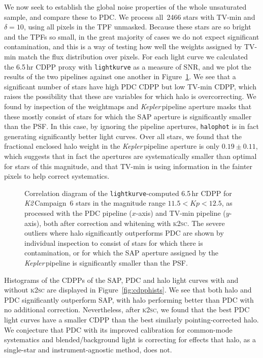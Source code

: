 \documentclass[modern]{aastex62}
\newcommand\kepler{\emph{Kepler}\,}
\newcommand\ktwo{\emph{K2}\,}
\begin{document}
We now seek to establish the global noise properties of the whole unsaturated sample, and compare these to PDC. We process all~2466 stars with TV-min and $\delta = 10$, using all pixels in the TPF unmasked. Because these stars are so bright and the TPFs so small, in the great majority  of cases we do not expect significant contamination, and this is a way of testing how well the weights assigned by TV-min match the flux distribution over pixels. For each light curve we calculated the 6.5\,hr CDPP proxy with \texttt{lightkurve} as a measure of SNR, and we plot the results of the two pipelines against one another in Figure~\ref{fig:halovspdc}. We see that a significant number of stars have high PDC CDPP but low TV-min CDPP, which raises the possibility that these are variables for which halo is overcorrecting. We found by inspection of the weightmaps and \kepler pipeline aperture masks that these mostly consist of stars for which the SAP aperture is significantly smaller than the PSF. In this case, by ignoring the pipeline apertures, \texttt{halophot} is in fact generating significantly better light curves. Over all stars, we found that the fractional enclosed halo weight in the \kepler pipeline aperture is only $0.19 \pm 0.11$, which suggests that in fact the apertures are systematically smaller than optimal for stars of this magnitude, and that TV-min is using information in the fainter pixels to help correct systematics.

\begin{figure}
\caption{Correlation diagram of the \texttt{lightkurve}-computed 6.5\,hr CDPP for \ktwo Campaign~6 stars in the magnitude range $11.5 < Kp < 12.5$, as processed with the PDC pipeline ($x$-axis) and TV-min pipeline ($y$-axis), both after correction and whitening with \textsc{k2sc}. The severe outliers where halo significantly outperforms PDC are shown by individual inspection to consist of stars for which there is contamination, or for which the SAP aperture assigned by the \kepler pipeline is significantly smaller than the PSF.}
\label{fig:halovspdc}
\end{figure}

Histograms of the CDPPs of the SAP, PDC and halo light curves with and without \textsc{k2sc} are displayed in Figure~\ref{fig:cdpphists}. We see that both halo and PDC significantly outperform SAP, with halo performing better than PDC with no additional correction. Nevertheless, after \textsc{k2sc}, we found that the best PDC light curves have a smaller CDPP than the best similarly pointing-corrected halo. We conjecture that PDC with its improved calibration for common-mode systematics and blended/background light is correcting for effects that halo, as a single-star and instrument-agnostic method, does not.
\end{document}
